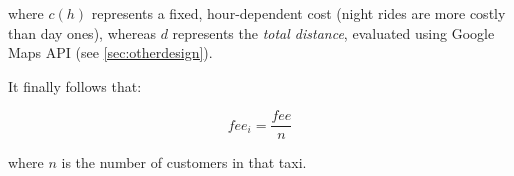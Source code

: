 where $c(h)$ represents a fixed, hour-dependent cost (night rides are more costly than day ones), whereas $d$ represents the \emph{total distance}, evaluated using Google Maps API (see \ref{sec:otherdesign}).

It finally follows that:

\begin{equation}
    fee_i = \frac{fee}{n}
\end{equation}

where $n$ is the number of customers in that taxi.



